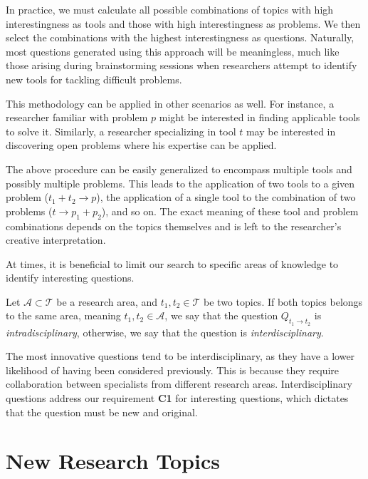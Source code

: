 In practice, we must calculate all possible combinations of topics with high interestingness as tools and those with high interestingness as problems. We then select the combinations with the highest interestingness as questions. Naturally, most questions generated using this approach will be meaningless, much like those arising during brainstorming sessions when researchers attempt to identify new tools for tackling difficult problems.

This methodology can be applied in other scenarios as well. For instance, a researcher familiar with problem $p$ might be interested in finding applicable tools to solve it. Similarly, a researcher specializing in tool $t$ may be interested in discovering open problems where his expertise can be applied.

The above procedure can be easily generalized to encompass multiple tools and possibly multiple problems. This leads to the application of two tools to a given problem ($ t_1 + t_2 \rightarrow p$), the application of a single tool to the combination of two problems ($t \rightarrow p_1 + p_2$), and so on. The exact meaning of these tool and problem combinations depends on the topics themselves and is left to the researcher's creative interpretation.

At times, it is beneficial to limit our search to specific areas of knowledge to identify interesting questions.

\begin{definition} 
Let $\mathcal{A} \subset \mathcal{T}$ be a research area, and $t_1, t_2 \in \mathcal{T}$ be two topics. If both topics belongs to the same area, meaning $t_1, t_2 \in \mathcal{A}$, we say that the question $Q_{t_1 \rightarrow t_2}$ is \emph{intradisciplinary}, otherwise, we say that the question is \emph{interdisciplinary}.
\end{definition}

The most innovative questions tend to be interdisciplinary, as they have a lower likelihood of having been considered previously. This is because they require collaboration between specialists from different research areas. Interdisciplinary questions address our requirement \textbf{C1} for interesting questions, which dictates that the question must be new and original.

%
%

\section{New Research Topics}
\label{sec:New_Research_Topics}


